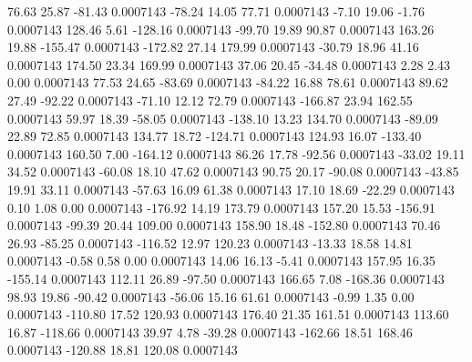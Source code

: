        76.63       25.87      -81.43     0.0007143
      -78.24       14.05       77.71     0.0007143
       -7.10       19.06       -1.76     0.0007143
      128.46        5.61     -128.16     0.0007143
      -99.70       19.89       90.87     0.0007143
      163.26       19.88     -155.47     0.0007143
     -172.82       27.14      179.99     0.0007143
      -30.79       18.96       41.16     0.0007143
      174.50       23.34      169.99     0.0007143
       37.06       20.45      -34.48     0.0007143
        2.28        2.43        0.00     0.0007143
       77.53       24.65      -83.69     0.0007143
      -84.22       16.88       78.61     0.0007143
       89.62       27.49      -92.22     0.0007143
      -71.10       12.12       72.79     0.0007143
     -166.87       23.94      162.55     0.0007143
       59.97       18.39      -58.05     0.0007143
     -138.10       13.23      134.70     0.0007143
      -89.09       22.89       72.85     0.0007143
      134.77       18.72     -124.71     0.0007143
      124.93       16.07     -133.40     0.0007143
      160.50        7.00     -164.12     0.0007143
       86.26       17.78      -92.56     0.0007143
      -33.02       19.11       34.52     0.0007143
      -60.08       18.10       47.62     0.0007143
       90.75       20.17      -90.08     0.0007143
      -43.85       19.91       33.11     0.0007143
      -57.63       16.09       61.38     0.0007143
       17.10       18.69      -22.29     0.0007143
        0.10        1.08        0.00     0.0007143
     -176.92       14.19      173.79     0.0007143
      157.20       15.53     -156.91     0.0007143
      -99.39       20.44      109.00     0.0007143
      158.90       18.48     -152.80     0.0007143
       70.46       26.93      -85.25     0.0007143
     -116.52       12.97      120.23     0.0007143
      -13.33       18.58       14.81     0.0007143
       -0.58        0.58        0.00     0.0007143
       14.06       16.13       -5.41     0.0007143
      157.95       16.35     -155.14     0.0007143
      112.11       26.89      -97.50     0.0007143
      166.65        7.08     -168.36     0.0007143
       98.93       19.86      -90.42     0.0007143
      -56.06       15.16       61.61     0.0007143
       -0.99        1.35        0.00     0.0007143
     -110.80       17.52      120.93     0.0007143
      176.40       21.35      161.51     0.0007143
      113.60       16.87     -118.66     0.0007143
       39.97        4.78      -39.28     0.0007143
     -162.66       18.51      168.46     0.0007143
     -120.88       18.81      120.08     0.0007143
